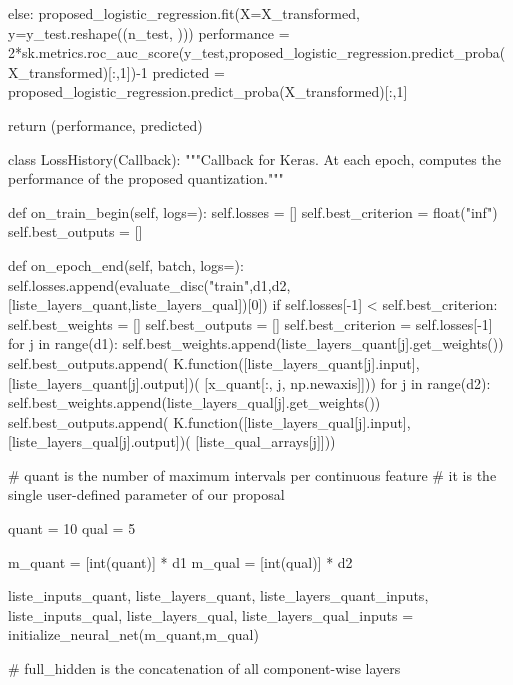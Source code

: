 \begin{pylisting}
        else:
            proposed_logistic_regression.fit(X=X_transformed, y=y_test.reshape((n_test, )))
            performance = 2*sk.metrics.roc_auc_score(y_test,proposed_logistic_regression.predict_proba(X_transformed)[:,1])-1
            predicted = proposed_logistic_regression.predict_proba(X_transformed)[:,1]

        return (performance, predicted)


    
    class LossHistory(Callback):
        """Callback for Keras. At each epoch, computes the performance of the proposed quantization."""

        def on_train_begin(self, logs={}):
            self.losses = []
            self.best_criterion = float("inf")
            self.best_outputs = []

        def on_epoch_end(self, batch, logs={}):
            self.losses.append(evaluate_disc("train",d1,d2,[liste_layers_quant,liste_layers_qual])[0])
            if self.losses[-1] < self.best_criterion:
                self.best_weights = []
                self.best_outputs = []
                self.best_criterion = self.losses[-1]
                for j in range(d1):
                    self.best_weights.append(liste_layers_quant[j].get_weights())
                    self.best_outputs.append(
                        K.function([liste_layers_quant[j].input],
                                   [liste_layers_quant[j].output])(
                                       [x_quant[:, j, np.newaxis]]))
                for j in range(d2):
                    self.best_weights.append(liste_layers_qual[j].get_weights())
                    self.best_outputs.append(
                        K.function([liste_layers_qual[j].input],
                                   [liste_layers_qual[j].output])(
                                       [liste_qual_arrays[j]]))
    
    
	# quant is the number of maximum intervals per continuous feature
	# it is the single user-defined parameter of our proposal    
    
    quant = 10
    qual = 5

    m_quant = [int(quant)] * d1
    m_qual = [int(qual)] * d2

	liste_inputs_quant, liste_layers_quant, liste_layers_quant_inputs, liste_inputs_qual, liste_layers_qual, liste_layers_qual_inputs = initialize_neural_net(m_quant,m_qual)

	# full_hidden is the concatenation of all component-wise layers
	

\end{pylisting}
